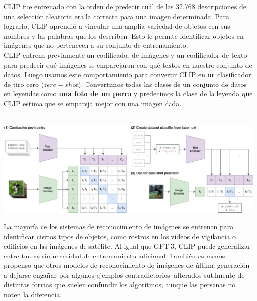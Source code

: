 \documentclass[runningheads,a4paper]{llncs}
\begin{document}
CLIP fue entrenado con la orden de predecir cu\'al de las 32.768 descripciones de una selecci\'on aleatoria era la correcta para una imagen determinada. Para lograrlo, CLIP aprendi\'o a vincular una amplia variedad de objetos con sus nombres y las palabras que los describen. Esto le permite identificar objetos en im\'agenes que no pertenecen a su conjunto de entrenamiento.\\

CLIP entrena previamente un codificador de im\'agenes y un codificador de texto para predecir qu\'e im\'agenes se emparejaron con qu\'e textos en nuestro conjunto de datos. Luego usamos este comportamiento para convertir CLIP en un clasificador de tiro cero ($zero-shot$). Convertimos todas las clases de un conjunto de datos en leyendas como {\bf una foto de un perro} y predecimos la clase de la leyenda que CLIP estima que se empareja mejor con una imagen dada.\\\\

\begin{center}
\includegraphics[scale=0.15]{img/CLIP.png}\\
 \cite{Clip}
\end{center}

La mayor\'ia de los sistemas de reconocimiento de im\'agenes se entrenan para identificar ciertos tipos de objetos, como rostros en los v\'ideos de vigilancia o edificios en las im\'agenes de sat\'elite. Al igual que GPT-3, CLIP puede generalizar entre tareas sin necesidad de entrenamiento adicional. Tambi\'en es menos propenso que otros modelos de reconocimiento de im\'agenes de \'ultima generaci\'on a dejarse enga\~nar por algunos ejemplos contradictorios, alterados sutilmente de distintas formas que suelen confundir los algoritmos, aunque las personas no noten la diferencia.\\
\end{document}
